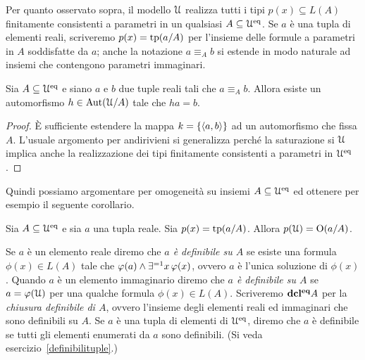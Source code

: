 Per quanto osservato sopra, il modello $\EuScript U$ realizza tutti i tipi $p(x)\subseteq L(A)$ finitamente consistenti a parametri in un qualsiasi $A\subseteq\EuScript U^{\rm eq}$. Se $a$ \`e una tupla di elementi reali, scriveremo \emph{$p(x)=\textrm{tp}(a/A)$} per l'insieme delle formule a parametri in $A$ soddisfatte da $a$; anche la notazione \emph{$a\equiv_Ab$\/} si estende in modo naturale ad insiemi che contengono parametri immaginari. 

\begin{lemma}\label{lemma_equiv_automorf}
Sia $A\subseteq\EuScript U^{\rm eq}$ e siano $a$ e $b$ due tuple reali tali che $a\equiv_Ab$. Allora esiste un automorfismo $h\in\textrm{Aut}(\EuScript U/A)$ tale che $ha=b$.
\end{lemma} 

\begin{proof}
\`E sufficiente estendere la mappa $k=\{\langle a,b\rangle\}$ ad un automorfismo che fissa $A$. L'usuale argomento per andirivieni si generalizza perch\'e la saturazione si $\EuScript U$ implica anche la realizzazione dei tipi finitamente consistenti a parametri in $\EuScript U^{\rm eq}$.
\end{proof}

Quindi possiamo argomentare per omogeneit\`a su insiemi $A\subseteq\EuScript U^{\rm eq}$ ed ottenere per esempio il seguente corollario.
\begin{corollary}
Sia $A\subseteq\EuScript U^{\rm eq}$ e sia $a$ una tupla reale. Sia  $p(x)=\textrm{tp}(a/A)$. Allora $p(\EuScript U)=\textrm{O}(a/A)$.\QED
\end{corollary}

Se $a$ \`e un elemento reale diremo che \emph{$a$ \`e definibile su $A$\/} se esiste una formula $\phi(x)\in L(A)$ tale che $\varphi(a)\wedge\exists^{=1}x\,\varphi(x)$, ovvero $a$ \`e l'unica soluzione di $\phi(x)$. Quando $a$ \`e un elemento immaginario diremo che  \emph{$a$ \`e definibile su $A$\/} se $a=\varphi(\EuScript U)$ per una qualche formula $\phi(x)\in L(A)$. Scriveremo \emph{${\rm\bf dcl^{eq}} A$\/} per la \emph{chiusura definibile di $A$}, ovvero l'insieme degli elementi reali ed immaginari che sono definibili su $A$. Se $a$ \`e una tupla di elementi di $\EuScript U^{\rm eq}$, diremo che $a$ \`e definibile se tutti gli elementi enumerati da $a$ sono definibili. (Si veda esercizio~\ref{definibilituple}.)

